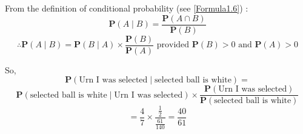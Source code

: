 From the definition of conditional probability (see \eqref{Formula1.6}) : 
\begin{equation*} 
\mathbf{P} (A \mid B) = \frac{\mathbf{P}(A \cap B)} {\mathbf{P}(B)}  
\end{equation*} 
\begin{equation*} 
\therefore \mathbf{P} (A \mid B) = \mathbf{P} (B \mid A) \times \frac{\mathbf{P}(B)}{\mathbf{P}(A)} \text{   provided } \mathbf{P}(B) > 0 \text{ and } \mathbf{P}(A) > 0
\end{equation*} 

So, \\ 
\begin{equation*} 
\mathbf{P}(\text{Urn I was selected} \mid \text{selected ball is white}) =
 \end{equation*} 
 \begin{equation*} 
\mathbf{P}(\text{selected ball is white} \mid \text{Urn I was selected}) \times \frac{\mathbf{P}(\text{Urn I was selected})}{\mathbf{P}(\text{selected ball is white}) }
 \end{equation*} 
 \begin{equation*} 
= \frac{4}{7} \times \frac{\frac{1}{2}}{\frac{61}{140}} = \frac{40}{61}
 \end{equation*} 
 


